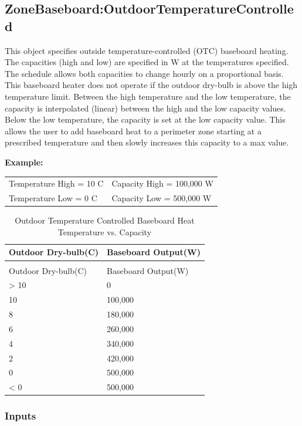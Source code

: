 \subsection{ZoneBaseboard:OutdoorTemperatureControlled}\label{zonebaseboardoutdoortemperaturecontrolled}

This object specifies outside temperature-controlled (OTC) baseboard heating. The capacities (high and low) are specified in W at the temperatures specified. The schedule allows both capacities to change hourly on a proportional basis. This baseboard heater does not operate if the outdoor dry-bulb is above the high temperature limit. Between the high temperature and the low temperature, the capacity is interpolated (linear) between the high and the low capacity values. Below the low temperature, the capacity is set at the low capacity value. This allows the user to add baseboard heat to a perimeter zone starting at a prescribed temperature and then slowly increases this capacity to a max value.

\textbf{Example:}

\begin{center}
  \begin{tabular}{@{}ll@{}}
    Temperature High = 10 C & Capacity High = 100,000 W \\
    Temperature Low = 0 C & Capacity Low = 500,000 W
  \end{tabular}
\end{center}

\begin{longtable}[c]{@{}ll@{}}
\caption{Outdoor Temperature Controlled Baseboard Heat Temperature vs. Capacity \label{table:outdoor-temperature-controlled-baseboard-heat}} \tabularnewline
\toprule
Outdoor Dry-bulb(C) & Baseboard Output(W) \tabularnewline
\midrule
\endfirsthead

\caption[]{Outdoor Temperature Controlled Baseboard Heat Temperature vs. Capacity} \tabularnewline
\toprule
Outdoor Dry-bulb(C) & Baseboard Output(W) \tabularnewline
\midrule
\endhead

> 10 & 0 \tabularnewline
10 & 100,000 \tabularnewline
8 & 180,000 \tabularnewline
6 & 260,000 \tabularnewline
4 & 340,000 \tabularnewline
2 & 420,000 \tabularnewline
0 & 500,000 \tabularnewline
< 0 & 500,000 \tabularnewline
\bottomrule
\end{longtable}

\subsubsection{Inputs}\label{inputs-18-003}

